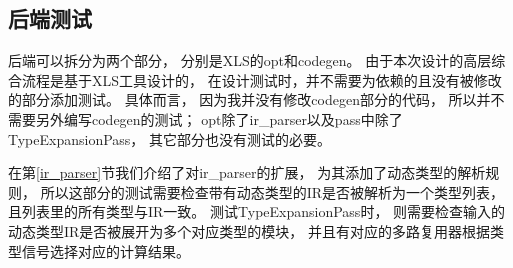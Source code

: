 \subsection{后端测试}

后端可以拆分为两个部分，
分别是XLS的opt和codegen。
由于本次设计的高层综合流程是基于XLS工具设计的，
在设计测试时，并不需要为依赖的且没有被修改的部分添加测试。
具体而言，
因为我并没有修改codegen部分的代码，
所以并不需要另外编写codegen的测试；
opt除了ir\_parser以及pass中除了TypeExpansionPass，
其它部分也没有测试的必要。

在第\ref{ir_parser}节我们介绍了对ir\_parser的扩展，
为其添加了动态类型的解析规则，
所以这部分的测试需要检查带有动态类型的IR是否被解析为一个类型列表，
且列表里的所有类型与IR一致。
测试TypeExpansionPass时，
则需要检查输入的动态类型IR是否被展开为多个对应类型的模块，
并且有对应的多路复用器根据类型信号选择对应的计算结果。